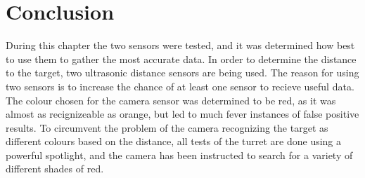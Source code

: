 \section{Conclusion}
During this chapter the two sensors were tested, and it was determined how best
to use them to gather the most accurate data. In order to determine the distance
to the target, two ultrasonic distance sensors are being used. The reason for
using two sensors is to increase the chance of at least one sensor to recieve
useful data. The colour chosen for the camera sensor was determined to be red,
as it was almost as recignizeable as orange, but led to much fever instances of
false positive results. To circumvent the problem of the camera recognizing the
target as different colours based on the distance, all tests of the turret are
done using a powerful spotlight, and the camera has been instructed to search
for a variety of different shades of red.
